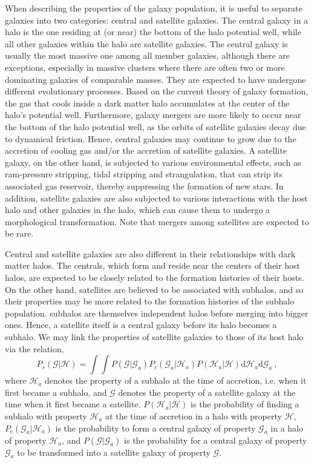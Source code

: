 \documentclass[12pt,a4paper]{article}
\newcommand{\dif}{\mathrm{d}}
\begin{document}
When describing the properties of the galaxy population, it is useful to separate galaxies into two categories: central and satellite galaxies. The central galaxy in a halo is the one residing at (or near) the bottom of the halo potential well, while all other galaxies within the halo are satellite galaxies. The central galaxy is usually the most massive one among all member galaxies, although there are exceptions, especially in massive clusters where there are often two or more dominating galaxies of comparable masses. They are expected to have undergone different evolutionary processes. Based on the current theory of galaxy formation, the gas that cools inside a dark matter halo accumulates at the center of the halo’s potential well. Furthermore, galaxy mergers are more likely to occur near the bottom of the halo potential well, as the orbits of satellite galaxies decay due to dynamical friction. Hence, central galaxies may continue to grow due to the accretion of cooling gas and/or the accretion of satellite galaxies. A satellite galaxy, on the other hand, is subjected to various environmental effects, such as ram-pressure stripping, tidal stripping and strangulation, that can strip its associated gas reservoir, thereby suppressing the formation of new stars. In addition, satellite galaxies are also subjected to various interactions with the host halo and other galaxies in the halo, which can cause them to undergo a morphological transformation. Note that mergers among satellites are expected to be rare.

Central and satellite galaxies are also different in their relationships with dark matter halos. The centrals, which form and reside near the centers of their host halos, are expected to be closely related to the formation histories of their hosts. On the other hand, satellites are believed to be associated with subhalos, and so their properties may be more related to the formation histories of the subhalo population. subhalos are themselves independent halos before merging into bigger ones. Hence, a satellite itself is a central galaxy before its halo becomes a subhalo. We may link the properties of satellite galaxies to those of its host halo via the relation,
\begin{equation}
P_s(\mathscr{G}|\mathscr{H}) = \int \int P(\mathscr{G}|\mathscr{G}_a) P_c(\mathscr{G}_a|\mathscr{H}_a) P(\mathscr{H}_a|\mathscr{H}) \dif \mathscr{H}_a \dif \mathscr{G}_a ~,
\end{equation}
where $\mathscr{H}_a$ denotes the property of a subhalo at the time of accretion, i.e. when it first became a subhalo, and $\mathscr{G}$ denotes the property of a satellite galaxy at the time when it first became a satellite. $P(\mathscr{H}_a|\mathscr{H})$ is the probability of finding a subhalo with property $\mathscr{H}_a$ at the time of accretion in a halo with property $\mathscr{H}$, $P_c(\mathscr{G}_a|\mathscr{H}_a)$ is the probability to form a central galaxy of property $\mathscr{G}_a$ in a halo of property $\mathscr{H}_a$, and $P(\mathscr{G}|\mathscr{G}_a)$ is the probability for a central galaxy of property $\mathscr{G}_a$ to be transformed into a satellite galaxy of property $\mathscr{G}$.
\end{document}
